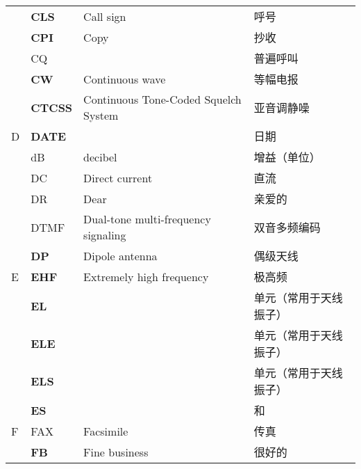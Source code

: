 \begin{longtable}[l]{llll}
    & \textbf{CLS}                      & Call sign                               & 呼号                  \\
    & \textbf{CPI}                      & Copy                                    & 抄收                  \\
    & CQ                                &                                         & 普遍呼叫                \\
    & \textbf{CW}                       & Continuous wave                         & 等幅电报                \\
    & \textbf{CTCSS}                    & Continuous Tone-Coded Squelch System    & 亚音调静噪               \\
  D & \textbf{DATE}                     &                                         & 日期                  \\
    & dB                                & decibel                                 & 增益（单位）              \\
    & DC                                & Direct current                          & 直流                  \\
    & DR                                & Dear                                    & 亲爱的                 \\
    & DTMF                              & Dual-tone multi-frequency signaling     & 双音多频编码              \\
    & \textbf{DP}                       & Dipole antenna                          & 偶级天线                \\
  E & \textbf{EHF}                      & Extremely high frequency                & 极高频                 \\
    & \textbf{EL}                       &                                         & 单元（常用于天线振子）         \\
    & \textbf{ELE}                      &                                         & 单元（常用于天线振子）         \\
    & \textbf{ELS}                      &                                         & 单元（常用于天线振子）         \\
    & \textbf{ES}                       &                                         & 和                   \\
  F & FAX                               & Facsimile                               & 传真                  \\
    & \textbf{FB}                       & Fine business                           & 很好的                 \\

\end{longtable}
